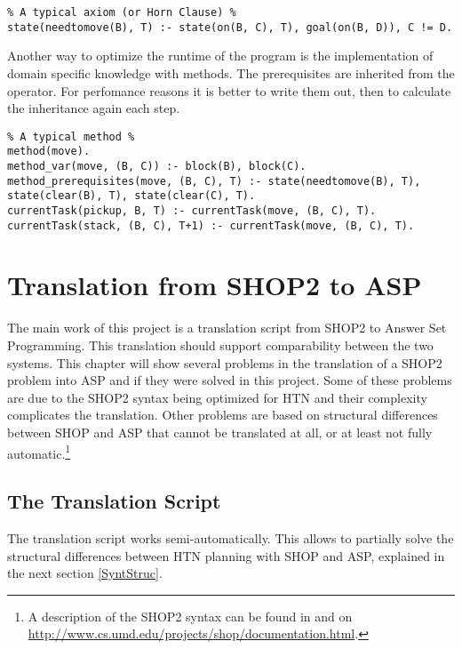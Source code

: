 \documentclass[10pt,a4paper]{article}
\begin{document}
\begin{lstlisting}
% A typical axiom (or Horn Clause) %
state(needtomove(B), T) :- state(on(B, C), T), goal(on(B, D)), C != D.
\end{lstlisting}

Another way to optimize the runtime of the program is the implementation of domain specific knowledge with methods. The prerequisites are inherited from the operator. For perfomance reasons it is better to write them out, then to calculate the inheritance again each step.

\begin{lstlisting}
% A typical method %
method(move).
method_var(move, (B, C)) :- block(B), block(C).
method_prerequisites(move, (B, C), T) :- state(needtomove(B), T), state(clear(B), T), state(clear(C), T).
currentTask(pickup, B, T) :- currentTask(move, (B, C), T).
currentTask(stack, (B, C), T+1) :- currentTask(move, (B, C), T).
\end{lstlisting}


\section{Translation from SHOP2 to ASP}\label{Trans}
The main work of this project is a translation script from SHOP2 to Answer Set Programming. This translation should support comparability between the two systems. This chapter will show several problems in the translation of a SHOP2 problem into ASP and if they were solved in this project. Some of these problems are due to the SHOP2 syntax being optimized for HTN and their complexity complicates the translation. Other problems are based on structural differences between SHOP and ASP that cannot be translated at all, or at least not fully automatic.\footnote{A description of the SHOP2 syntax can be found in \cite[ch.~2.1]{Nau99} and on \url{http://www.cs.umd.edu/projects/shop/documentation.html}.}

\subsection{The Translation Script}
The translation script works semi-automatically. This allows to partially solve the structural differences between HTN planning with SHOP and ASP, explained in the next section \ref{SyntStruc}.
\end{document}
